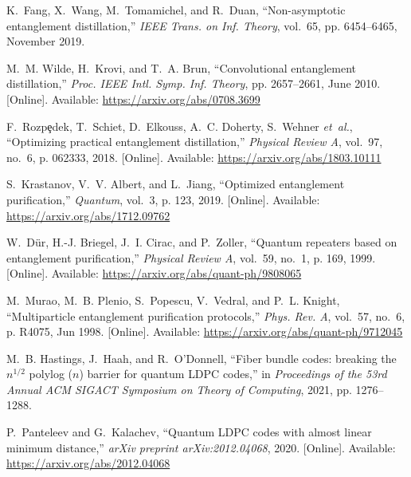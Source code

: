 \documentclass[journal,onecolumn]{IEEEtran}
\begin{document}
\begin{thebibliography}{10}
K.~Fang, X.~Wang, M.~Tomamichel, and R.~Duan, ``Non-asymptotic entanglement
  distillation,'' \emph{IEEE Trans. on Inf. Theory}, vol.~65, pp. 6454--6465,
  November 2019.

\BIBentryALTinterwordspacing
M.~M. Wilde, H.~Krovi, and T.~A. Brun, ``Convolutional entanglement
  distillation,'' \emph{Proc. IEEE Intl. Symp. Inf. Theory}, pp. 2657--2661,
  June 2010. [Online]. Available: \url{https://arxiv.org/abs/0708.3699}
\BIBentrySTDinterwordspacing

\BIBentryALTinterwordspacing
F.~Rozp{\c e}dek, T.~Schiet, D.~Elkouss, A.~C. Doherty, S.~Wehner
  \emph{et~al.}, ``Optimizing practical entanglement distillation,''
  \emph{Physical Review A}, vol.~97, no.~6, p. 062333, 2018. [Online].
  Available: \url{https://arxiv.org/abs/1803.10111}
\BIBentrySTDinterwordspacing

\BIBentryALTinterwordspacing
S.~Krastanov, V.~V. Albert, and L.~Jiang, ``Optimized entanglement
  purification,'' \emph{Quantum}, vol.~3, p. 123, 2019. [Online]. Available:
  \url{https://arxiv.org/abs/1712.09762}
\BIBentrySTDinterwordspacing

\BIBentryALTinterwordspacing
W.~D{\"u}r, H.-J. Briegel, J.~I. Cirac, and P.~Zoller, ``Quantum repeaters
  based on entanglement purification,'' \emph{Physical Review A}, vol.~59,
  no.~1, p. 169, 1999. [Online]. Available:
  \url{https://arxiv.org/abs/quant-ph/9808065}
\BIBentrySTDinterwordspacing

\BIBentryALTinterwordspacing
M.~Murao, M.~B. Plenio, S.~Popescu, V.~Vedral, and P.~L. Knight,
  ``{Multiparticle entanglement purification protocols},'' \emph{Phys. Rev. A},
  vol.~57, no.~6, p. R4075, Jun 1998. [Online]. Available:
  \url{https://arxiv.org/abs/quant-ph/9712045}
\BIBentrySTDinterwordspacing

M.~B. Hastings, J.~Haah, and R.~O'Donnell, ``Fiber bundle codes: breaking the
  $n^{1/2}$ polylog ($n$) barrier for quantum {LDPC} codes,'' in
  \emph{Proceedings of the 53rd Annual ACM SIGACT Symposium on Theory of
  Computing}, 2021, pp. 1276--1288.

\BIBentryALTinterwordspacing
P.~Panteleev and G.~Kalachev, ``Quantum {LDPC} codes with almost linear minimum
  distance,'' \emph{arXiv preprint arXiv:2012.04068}, 2020. [Online].
  Available: \url{https://arxiv.org/abs/2012.04068}
\BIBentrySTDinterwordspacing


\end{thebibliography}
\end{document}
